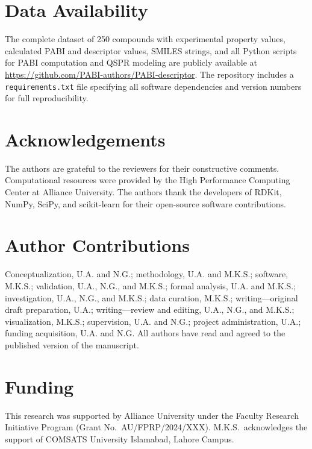 \documentclass[12pt,a4paper]{article}
\begin{document}
\section*{Data Availability}
The complete dataset of 250 compounds with experimental property values, calculated PABI and descriptor values, SMILES strings, and all Python scripts for PABI computation and QSPR modeling are publicly available at \url{https://github.com/PABI-authors/PABI-descriptor}. The repository includes a \texttt{requirements.txt} file specifying all software dependencies and version numbers for full reproducibility.

\section*{Acknowledgements}
The authors are grateful to the reviewers for their constructive comments. Computational resources were provided by the High Performance Computing Center at Alliance University. The authors thank the developers of RDKit, NumPy, SciPy, and scikit-learn for their open-source software contributions.

\section*{Author Contributions}
Conceptualization, U.A. and N.G.; methodology, U.A. and M.K.S.; software, M.K.S.; validation, U.A., N.G., and M.K.S.; formal analysis, U.A. and M.K.S.; investigation, U.A., N.G., and M.K.S.; data curation, M.K.S.; writing---original draft preparation, U.A.; writing---review and editing, U.A., N.G., and M.K.S.; visualization, M.K.S.; supervision, U.A. and N.G.; project administration, U.A.; funding acquisition, U.A. and N.G. All authors have read and agreed to the published version of the manuscript.

\section*{Funding}
This research was supported by Alliance University under the Faculty Research Initiative Program (Grant No.\ AU/FPRP/2024/XXX). M.K.S.\ acknowledges the support of COMSATS University Islamabad, Lahore Campus.
\end{document}
